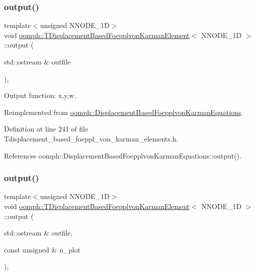 \subsubsection{\texorpdfstring{output()}{output()}\hspace{0.1cm}{\footnotesize\ttfamily [1/4]}}
{\footnotesize\ttfamily template$<$unsigned N\+N\+O\+D\+E\+\_\+1D$>$ \\
void \hyperlink{classoomph_1_1TDisplacementBasedFoepplvonKarmanElement}{oomph\+::\+T\+Displacement\+Based\+Foepplvon\+Karman\+Element}$<$ N\+N\+O\+D\+E\+\_\+1D $>$\+::output (\begin{DoxyParamCaption}\item[{std\+::ostream \&}]{outfile }\end{DoxyParamCaption})\hspace{0.3cm}{\ttfamily [inline]}, {\ttfamily [virtual]}}



Output function\+: x,y,w. 



Reimplemented from \hyperlink{classoomph_1_1DisplacementBasedFoepplvonKarmanEquations_a7e806927a451e21dc0b2f10cf98a5941}{oomph\+::\+Displacement\+Based\+Foepplvon\+Karman\+Equations}.



Definition at line 241 of file Tdisplacement\+\_\+based\+\_\+foeppl\+\_\+von\+\_\+karman\+\_\+elements.\+h.



References oomph\+::\+Displacement\+Based\+Foepplvon\+Karman\+Equations\+::output().

\mbox{\label{classoomph_1_1TDisplacementBasedFoepplvonKarmanElement_aa763fb490c43b132ea3322cad5f1662f}} 
\subsubsection{\texorpdfstring{output()}{output()}\hspace{0.1cm}{\footnotesize\ttfamily [2/4]}}
{\footnotesize\ttfamily template$<$unsigned N\+N\+O\+D\+E\+\_\+1D$>$ \\
void \hyperlink{classoomph_1_1TDisplacementBasedFoepplvonKarmanElement}{oomph\+::\+T\+Displacement\+Based\+Foepplvon\+Karman\+Element}$<$ N\+N\+O\+D\+E\+\_\+1D $>$\+::output (\begin{DoxyParamCaption}\item[{std\+::ostream \&}]{outfile,  }\item[{const unsigned \&}]{n\+\_\+plot }\end{DoxyParamCaption})\hspace{0.3cm}{\ttfamily [inline]}, {\ttfamily [virtual]}}



